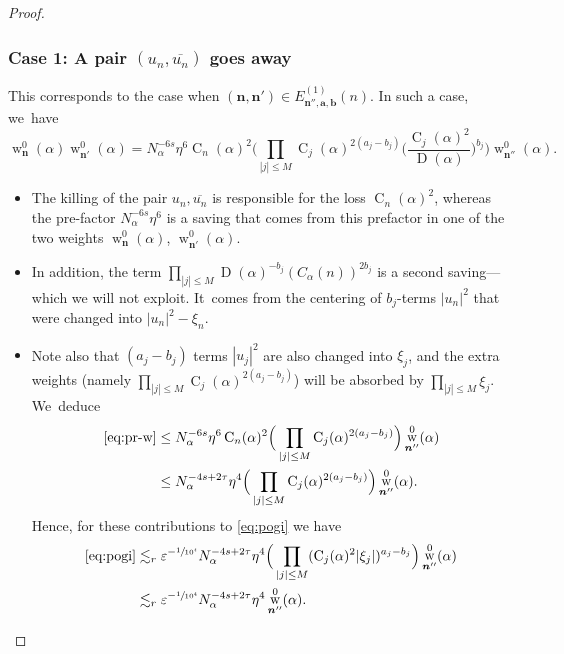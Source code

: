 \documentclass[10pt,a4paper]{amsart}
\DeclareMathOperator{\rw}{w}
\theoremstyle{plain}
\theoremstyle{definition}
\newcommand{\nb}{{\boldsymbol n}}
\newcommand{\1}{\mathbf{1}}
\let\epsilon\varepsilon
\begin{document}
\begin{proof}
\subsubsection*{Case 1: A pair $(u_n,\overline{u_{n}})$ goes away} This corresponds to the case when $(\nb,\nb')\in E_{\nb'',\boldsymbol{a},\boldsymbol{b}}^{(1)}(n)$. In such a case, we~have
\begin{equation}
\label{eq:pr-w}
\rw_{\nb}^{0}(\alpha)\rw_{\nb'}^{0}(\alpha)
=N_\alpha^{-6s}\eta^{6}\operatorname{C}_{n}(\alpha)^2
\Big(\prod_{|j|\leq M}\operatorname{C}_{j}(\alpha)^{2(a_{j}-b_{j})}
\Big(\frac{\operatorname{C}_{j}(\alpha)^{2}}{\operatorname{D}(\alpha)}\Big)^{b_{j}}
\Big)
\rw_{\nb''}^{0}(\alpha).
\end{equation}

\begin{itemize}
\item
The killing of the pair $u_n,\overline{u_{n}}$ is responsible for the loss $\operatorname{C}_{n}(\alpha)^2$, whereas the pre-factor $N_{\alpha}^{-6s}\eta^{6}$ is a saving that comes from this prefactor in one of the two weights $\rw_{\nb}^{0}(\alpha)$, $\rw_{\nb'}^{0}(\alpha)$.

\item
In addition, the term $\prod_{|j|\leq M}\operatorname{D}(\alpha)^{-b_{j}}(C_\alpha(n))^{2b_{j}}$ is a second saving---which we will not exploit. It~comes from the centering of $b_{j}$-terms $|u_n|^{2}$ that were changed into $|u_{n}|^{2}-\xi_{n}$.

\item
Note also that $(a_{j}-b_{j})$ terms $|u_{j}|^{2}$ are also changed into $\xi_j$, and the extra weights (namely $\prod_{|j|\leq M}\operatorname{C}_{j}(\alpha)^{2(a_{j}-b_{j})}$) will be absorbed by $\prod_{|j|\leq M}\xi_{j}$. We~deduce
\begin{align*}
\eqref{eq:pr-w}
&\leq N_{\alpha}^{-6s}\eta^{6}\operatorname{C}_{n}(\alpha)^2
\Big(
\prod_{|j|\leq M}\operatorname{C}_{j}(\alpha)^{2(a_{j}-b_{j})}
\Big)
\rw_{\nb''}^{0}(\alpha) \\
&\leq N_\alpha^{-4s+2\tau}\eta^{4}
\Big(\prod_{|j|\leq M}\operatorname{C}_{j}(\alpha)^{2(a_{j}-b_{j})}
\Big)
\rw_{\nb''}^{0}(\alpha).
\end{align*}
Hence, for these contributions to \eqref{eq:pogi} we have
\begin{align*}
\eqref{eq:pogi}
&\lesssim_{r} \epsilon^{-\sfrac{1}{10^{4}}}
N_{\alpha}^{-4s+2\tau}\eta^{4}
\Big(\prod_{|j|\leq M}(\mathrm{C}_{j}(\alpha)^{2}|\xi_{j}|)^{a_{j}-b_{j}}
\Big)
\rw_{\nb''}^{0}(\alpha) \\
&\lesssim_{r}
\epsilon^{-\sfrac{1}{10^{4}}}
N_{\alpha}^{-4s+2\tau}\eta^{4}
\rw_{\nb''}^{0}(\alpha).
\end{align*}
\end{itemize}


\end{proof}
\end{document}

